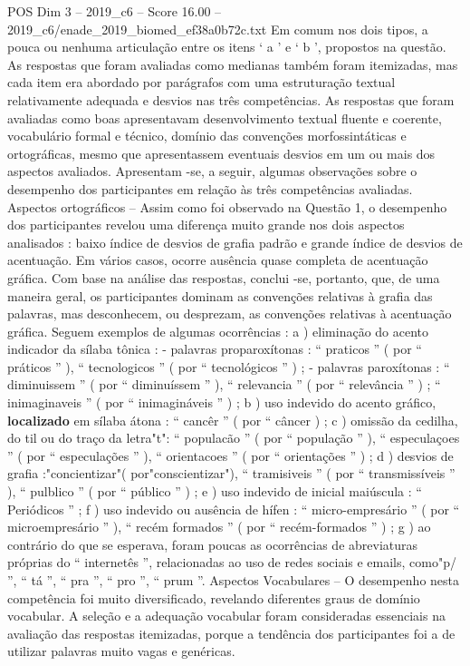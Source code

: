 \begin{textsample}{POS Dim 3 – 2019\_c6 – Score 16.00 – 2019\_c6/enade\_2019\_biomed\_ef38a0b72c.txt}
Em comum nos dois tipos, a pouca ou nenhuma articulação entre os itens ‘ a ’ e ‘ b ’, propostos na questão.
As respostas que foram avaliadas como medianas também foram itemizadas, mas cada item era abordado por parágrafos com uma estruturação textual relativamente adequada e desvios nas três competências.
As respostas que foram avaliadas como boas apresentavam desenvolvimento textual fluente e coerente, vocabulário formal e técnico, domínio das convenções morfossintáticas e ortográficas, mesmo que apresentassem eventuais desvios em um ou mais dos aspectos avaliados.
Apresentam -se, a seguir, algumas observações sobre o desempenho dos participantes em relação às três competências avaliadas.
Aspectos ortográficos – Assim como foi observado na Questão 1, o desempenho dos participantes revelou uma diferença muito grande nos dois aspectos analisados : baixo índice de desvios de grafia padrão e grande índice de desvios de acentuação.
Em vários casos, ocorre ausência quase completa de acentuação gráfica.
Com base na análise das respostas, conclui -se, portanto, que, de uma maneira geral, os participantes dominam as convenções relativas à grafia das palavras, mas desconhecem, ou desprezam, as convenções relativas à acentuação gráfica.
Seguem exemplos de algumas ocorrências : a ) eliminação do acento indicador da sílaba tônica : - palavras proparoxítonas : “ praticos ” ( por “ práticos ” ), “ tecnologicos ” ( por “ tecnológicos ” ) ; - palavras paroxítonas : “ diminuissem ” ( por “ diminuíssem ” ), “ relevancia ” ( por “ relevância ” ) ; “ inimaginaveis ” ( por “ inimagináveis ” ) ; b ) uso indevido do acento gráfico, \textbf{localizado} em sílaba átona : “ cancêr ” ( por “ câncer ) ; c ) omissão da cedilha, do til ou do traço da letra"t": “ populacão ” ( por “ população ” ), “ especulaçoes ” ( por “ especulações ” ), “ orientacoes ” ( por “ orientações ” ) ; d ) desvios de grafia :"concientizar"( por"conscientizar"), “ tramisiveis ” ( por “ transmissíveis ” ), “ pulblico ” ( por “ público ” ) ; e ) uso indevido de inicial maiúscula : “ Periódicos ” ; f ) uso indevido ou ausência de hífen : “ micro-empresário ” ( por “ microempresário ” ), “ recém formados ” ( por “ recém-formados ” ) ; g ) ao contrário do que se esperava, foram poucas as ocorrências de abreviaturas próprias do “ internetês ”, relacionadas ao uso de redes sociais e emails, como"p/ ”, “ tá ”, “ pra ”, “ pro ”, “ prum ”.
Aspectos Vocabulares – O desempenho nesta competência foi muito diversificado, revelando diferentes graus de domínio vocabular.
A seleção e a adequação vocabular foram consideradas essenciais na avaliação das respostas itemizadas, porque a tendência dos participantes foi a de utilizar palavras muito vagas e genéricas.

\end{textsample}
